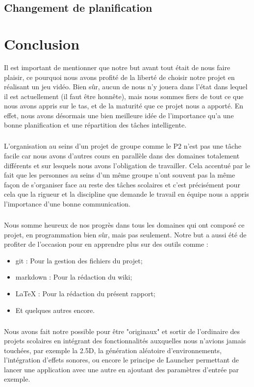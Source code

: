 \documentclass[a4paper,10pt,openany,oneside]{report}
\begin{document}
\section{Changement de planification}


\chapter{Conclusion}
\thispagestyle{headings}
Il est important de mentionner que notre but avant tout était de nous faire plaisir, ce pourquoi nous avons profité de la liberté de choisir notre projet en réalisant un jeu vidéo. Bien sûr, aucun de nous n'y jouera dans l'état dans lequel il est actuellement (il faut être honnête), mais nous sommes fiers de tout ce que nous avons appris sur le tas, et de la maturité que ce projet nous a apporté. En effet, nous avons désormais une bien meilleure idée de l'importance qu'a une bonne planification et une répartition des tâches intelligente.
\paragraph{}
L'organisation au seins d'un projet de groupe comme le P2 n'est pas une tâche facile car nous avons d'autres cours en parallèle dans des domaines totalement différents et sur lesquels nous avons l'obligation de travailler. Cela accentué par le fait que les personnes au seins d'un même groupe n'ont souvent pas la même façon de s'organiser face au reste des tâches scolaires et c'est précisément pour cela que la rigueur et la discipline que demande le travail en équipe nous a appris l'importance d'une bonne communication.
\paragraph{}
Nous somme heureux de nos progrès dans tous les domaines qui ont composé ce projet, en programmation bien sûr, mais pas seulement. Notre but a aussi été de profiter de l'occasion pour en apprendre plus sur des outils comme :
\begin{itemize}
\item git : Pour la gestion des fichiers du projet;
\item markdown : Pour la rédaction du wiki;
\item LaTeX : Pour la rédaction du présent rapport;
\item Et quelques autres encore.
\end{itemize}
\paragraph{}
Nous avons fait notre possible pour être "originaux" et sortir de l'ordinaire des projets scolaires en intégrant des fonctionnalités auxquelles nous n'avions jamais touchées, par exemple la 2.5D, la génération aléatoire d'environnements, l'intégration d'effets sonores, ou encore le principe de Launcher permettant de lancer une application avec une autre en ajoutant des paramètres d'entrée par exemple.
\end{document}
